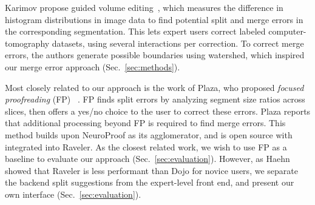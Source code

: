 
Karimov \etal propose guided volume editing~\cite{karimov_guided_volume_editing}, which measures the difference in histogram distributions in image data to find potential split and merge errors in the corresponding segmentation. This lets expert users correct labeled computer-tomography datasets, using several interactions per correction. To correct merge errors, the authors generate possible boundaries using watershed, which inspired our merge error approach (Sec.~\ref{sec:methods}). 

Most closely related to our approach is the work of Plaza, who proposed \textit{focused proofreading} (FP) ~\cite{focused_proofreading}. FP finds split errors by analyzing segment size ratios across slices, then offers a yes/no choice to the user to correct these errors. Plaza reports that additional processing beyond FP is required to find merge errors. This method builds upon NeuroProof \cite{neuroproof2013} as its agglomerator, and is open source with integrated into Raveler. As the closest related work, we wish to use FP as a baseline to evaluate our approach (Sec.~\ref{sec:evaluation}). However, as Haehn \etal showed that Raveler is less performant than Dojo for novice users, we separate the backend split suggestions from the expert-level front end, and present our own interface (Sec.~\ref{sec:evaluation}).

